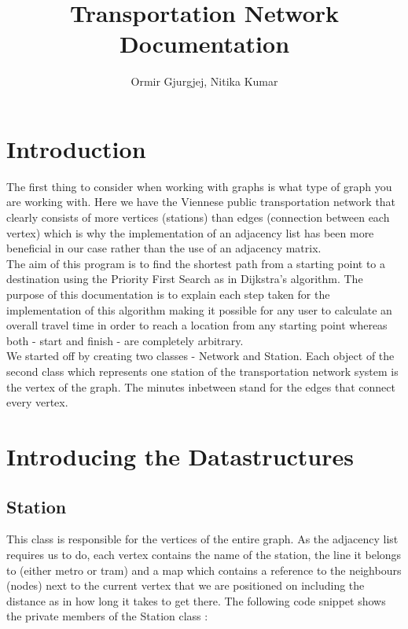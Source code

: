 \documentclass[12pt]{article}
\begin{document}
\title{{\huge \bfseries Transportation Network Documentation}}
\author{Ormir Gjurgjej, Nitika Kumar}
\maketitle

\section{Introduction}
The first thing to consider when working with graphs is what type of graph you are working with. Here we have the Viennese public transportation network that clearly consists of more vertices (stations) than edges (connection between each vertex) which is why the implementation of an adjacency list has been more beneficial in our case rather than the use of an adjacency matrix. 
\\
The aim of this program is to find the shortest path from a starting point to a destination using the Priority First Search as in Dijkstra's algorithm. The purpose of this documentation is to explain each step taken for the implementation of this algorithm making it possible for any user to calculate an overall travel time in order to reach a location from any starting point whereas both - start and finish - are completely arbitrary.\\
We started off by creating two classes - Network and Station. Each object of the second class which represents one station of the transportation network system is the vertex of the graph. The minutes inbetween stand for the edges that connect every vertex.\\
\section{Introducing the Datastructures}
\subsection{Station}
This class is responsible for the vertices of the entire graph. As the adjacency list requires us to do, each vertex contains the name of the station, the line it belongs to (either metro or tram) and a map which contains a reference to the neighbours (nodes) next to the current vertex that we are positioned on including the distance as in how long it takes to get there. The following code snippet shows the private members of the Station class $\colon$ \\
\end{document}
